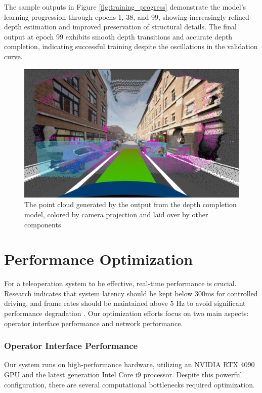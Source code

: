 The sample outputs in Figure \ref{fig:training_progress} demonstrate the model's learning progression through epochs 1, 38, and 99, showing increasingly refined depth estimation and improved preservation of structural details. The final output at epoch 99 exhibits smooth depth transitions and accurate depth completion, indicating successful training despite the oscillations in the validation curve.
\begin{figure}
    \centering
    \includegraphics[width=\textwidth, trim=0 150pt 0 50pt, clip]{figures/depth_comp_2.png}
    \caption{The point cloud generated by the output from the depth completion model, colored by camera projection and laid over by other components}
    \label{fig:depth_completion_result}
\end{figure}

\section{Performance Optimization}\label{section:performanceoptimization}

For a teleoperation system to be effective, real-time performance is crucial. Research indicates that system latency should be kept below 300ms for controlled driving, and frame rates should be maintained above 5 Hz to avoid significant performance degradation \cite{neumeier2023feasibility}. Our optimization efforts focus on two main aspects: operator interface performance and network performance.

\subsubsection{Operator Interface Performance}
Our system runs on high-performance hardware, utilizing an NVIDIA RTX 4090 GPU and the latest generation Intel Core i9 processor. Despite this powerful configuration, there are several computational bottlenecks required optimization.

